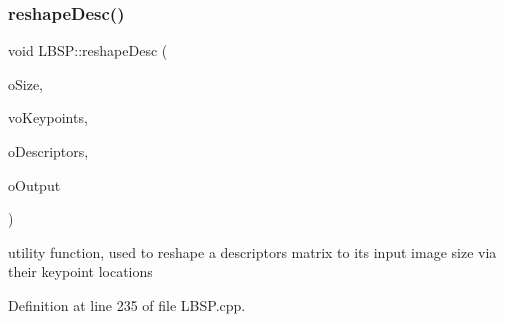 \subsubsection{\texorpdfstring{reshape\+Desc()}{reshapeDesc()}}
{\footnotesize\ttfamily void L\+B\+S\+P\+::reshape\+Desc (\begin{DoxyParamCaption}\item[{cv\+::\+Size}]{o\+Size,  }\item[{const std\+::vector$<$ cv\+::\+Key\+Point $>$ \&}]{vo\+Keypoints,  }\item[{const cv\+::\+Mat \&}]{o\+Descriptors,  }\item[{cv\+::\+Mat \&}]{o\+Output }\end{DoxyParamCaption})\hspace{0.3cm}{\ttfamily [static]}}



utility function, used to reshape a descriptors matrix to its input image size via their keypoint locations 



Definition at line 235 of file L\+B\+S\+P.\+cpp.


